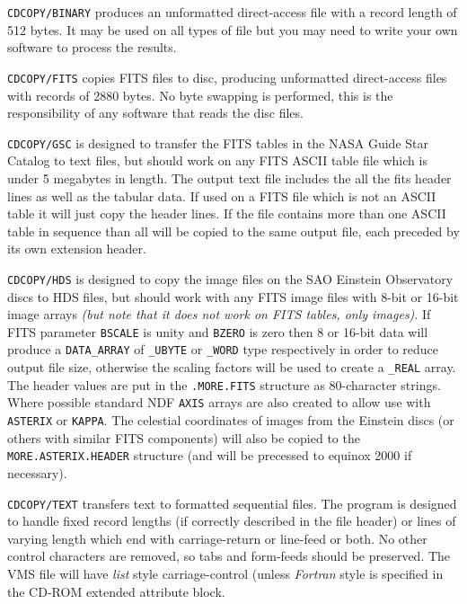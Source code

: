 \begin{description}
\item {\tt CDCOPY/BINARY} produces an unformatted direct-access file
with a record length of 512 bytes. It may be used on all types of file
but you may need to write your own software to process the results. 

\item {\tt CDCOPY/FITS} copies FITS files to disc, producing unformatted
direct-access files with records of 2880 bytes.  No byte swapping is
performed, this is the responsibility of any software that reads the
disc files.  

\item {\tt CDCOPY/GSC} is designed to transfer the FITS tables in the
NASA Guide Star Catalog to text files, but should work on any FITS ASCII
table file which is under 5 megabytes in length. The output text file
includes the all the fits header lines as well as the tabular data. If
used on a FITS file which is not an ASCII table it will just copy the
header lines.  If the file contains more than one ASCII table in
sequence than all will be copied to the same output file, each preceded
by its own extension header. 

\item {\tt CDCOPY/HDS} is designed to copy the image files on the SAO
Einstein Observatory discs to HDS files, but should work with any FITS
image files with 8-bit or 16-bit image arrays {\em (but note that it does 
not work on FITS tables, only images)}. If FITS parameter {\tt BSCALE}
is unity and {\tt BZERO} is zero then 8 or 16-bit data will produce a
{\tt DATA\_ARRAY} of {\tt \_UBYTE} or {\tt \_WORD} type respectively in
order to reduce output file size, otherwise the scaling factors will be
used to create a {\tt \_REAL} array.  The header values are put in the
{\tt .MORE.FITS} structure as 80-character strings.  Where possible
standard NDF {\tt AXIS} arrays are also created to allow use with {\tt
ASTERIX} or {\tt KAPPA}.  The celestial coordinates of images from the
Einstein discs (or others with similar FITS components) will also be
copied to the {\tt MORE.ASTERIX.HEADER} structure (and will be precessed
to equinox 2000 if necessary). 

\item {\tt CDCOPY/TEXT} transfers text to formatted sequential files.
The program is designed to handle fixed record lengths (if
correctly described in the file header) or lines of varying length which
end with carriage-return or line-feed or both.  No other control
characters are removed, so tabs and form-feeds should be preserved. The
VMS file will have {\it list} style carriage-control (unless {\it
Fortran} style is specified in the CD-ROM extended attribute block.

\end{description}
